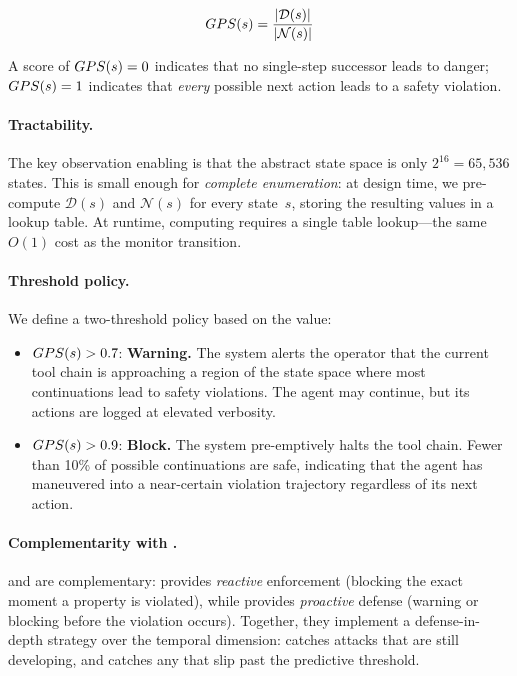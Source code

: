 \begin{equation}
  GPS(s) = \frac{|\mathcal{D}(s)|}{|\mathcal{N}(s)|}
  \label{eq:gps}
\end{equation}

\noindent A score of $GPS(s) = 0$ indicates that no single-step successor
leads to danger; $GPS(s) = 1$ indicates that \emph{every} possible next
action leads to a safety violation.

\paragraph{Tractability.} The key observation enabling \gps is that the
abstract state space is only $2^{16} = 65{,}536$ states. This is small enough
for \emph{complete enumeration}: at design time, we pre-compute
$\mathcal{D}(s)$ and $\mathcal{N}(s)$ for every state~$s$, storing the
resulting \gps values in a lookup table. At runtime, computing \gps requires
a single table lookup---the same $O(1)$ cost as the \tsa monitor transition.

\paragraph{Threshold policy.} We define a two-threshold policy based on
the \gps value:

\begin{itemize}[leftmargin=*]
\item $GPS(s) > 0.7$: \textbf{Warning.} The system alerts the operator that
      the current tool chain is approaching a region of the state space where
      most continuations lead to safety violations. The agent may continue,
      but its actions are logged at elevated verbosity.
\item $GPS(s) > 0.9$: \textbf{Block.} The system pre-emptively halts the
      tool chain. Fewer than 10\% of possible continuations are safe,
      indicating that the agent has maneuvered into a near-certain violation
      trajectory regardless of its next action.
\end{itemize}

\paragraph{Complementarity with \tsa.} \gps and \tsa are complementary:
\tsa provides \emph{reactive} enforcement (blocking the exact moment a
property is violated), while \gps provides \emph{proactive} defense (warning
or blocking before the violation occurs). Together, they implement a
defense-in-depth strategy over the temporal dimension: \gps catches attacks
that are still developing, and \tsa catches any that slip past the predictive
threshold.


